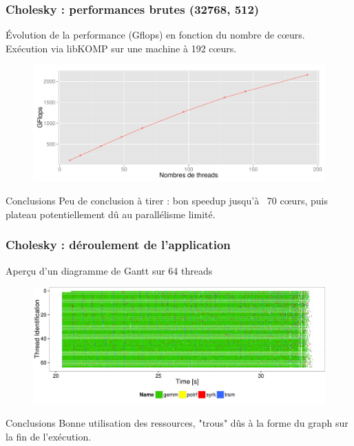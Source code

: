 \documentclass[xcolor={usenames,dvipsnames,svgnames,table}, aspectratio=43]{beamer}
\begin{document}
\begin{frame}
  \frametitle{Cholesky : performances brutes (32768, 512)}

  Évolution de la performance (Gflops) en fonction du nombre de cœurs.\\
  Exécution via libKOMP sur une machine à 192 cœurs.

\begin{figure}
  \includegraphics[width=\textwidth]{graph/graph_evolution_cholesky_32768_512.pdf}
\end{figure}
 {
  \begin{block}{Conclusions}
    Peu de conclusion à tirer : bon speedup jusqu'à ~70 cœurs, puis plateau potentiellement dû au parallélisme limité.
  \end{block}
}

\end{frame}

\begin{frame}
\frametitle{Cholesky : déroulement de l'application}

Aperçu d'un diagramme de Gantt sur 64 threads
\begin{figure}
  \includegraphics[width=\textwidth]{graph/gantt_32768_512.pdf}
\end{figure}
 {
  \begin{block}{Conclusions}
    Bonne utilisation des ressources, "trous" dûs à la forme du graph sur la fin de l'exécution.
  \end{block}
}

\end{frame}
\end{document}
